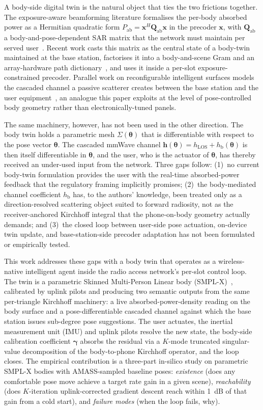\documentclass[journal,twocolumn,10pt]{IEEEtran}
\theoremstyle{plain}
\theoremstyle{definition}
\theoremstyle{remark}
\newcommand{\xx}{\mathbf{x}}
\newcommand{\hh}{\mathbf{h}}
\newcommand{\Pabs}{P_{\mathrm{ab}}}
\newcommand{\Qabs}{\mathbf{Q}_{\mathrm{ab}}}
\newcommand{\thetab}{\bm{\theta}}
\newcommand{\gammab}{\bm{\gamma}}
\newcommand{\hLOS}{h_{\mathrm{LOS}}}
\newcommand{\hbody}{h_{\mathrm{b}}}
\begin{document}
A body-side digital twin is the natural object that ties the two
frictions together. The exposure-aware beamforming literature
formalises the per-body absorbed power as a Hermitian quadratic form
$\Pabs = \xx^H \Qabs \xx$ in the precoder $\xx$, with $\Qabs$ a
body-and-pose-dependent SAR matrix that the network must maintain
per served user~\cite{Hochwald2014, Ying2015, Ying2017}. Recent
work casts this matrix as the central state of a body-twin
maintained at the base station, factorises it into a body-and-scene
Gram and an array-hardware path
dictionary~\cite{Wydaeghe2026jsacv5}, and uses it inside a per-slot
exposure-constrained precoder. Parallel work on reconfigurable
intelligent surfaces models the cascaded channel a passive
scatterer creates between the base station and the user
equipment~\cite{DiRenzo2020,Wu2019}, an analogue this paper
exploits at the level of pose-controlled body geometry rather than
electronically-tuned panels.

The same machinery, however, has not been used in the other
direction. The body twin holds a parametric mesh
$\Sigma(\thetab)$ that is differentiable with respect to the pose
vector $\thetab$. The cascaded mmWave channel
$\hh(\thetab) = \hLOS + \hbody(\thetab)$ is then itself
differentiable in $\thetab$, and the user, who is the actuator of
$\thetab$, has thereby received an under-used input from the
network. Three gaps follow:
(1)~no current body-twin formulation provides the user with the
real-time absorbed-power feedback that the regulatory framing
implicitly promises;
(2)~the body-mediated channel coefficient $\hbody$ has, to the
authors' knowledge, been treated only as a direction-resolved
scattering object suited to forward radiosity, not as the receiver-anchored
Kirchhoff integral that the phone-on-body geometry actually
demands; and
(3)~the closed loop between user-side pose actuation, on-device
twin update, and base-station-side precoder adaptation has not been
formulated or empirically tested.

This work addresses these gaps with a body twin that operates as a
wireless-native intelligent agent inside the radio access network's
per-slot control loop. The twin is a parametric Skinned Multi-Person
Linear body (SMPL-X)~\cite{SMPLX2019}, calibrated by uplink pilots
and producing two semantic outputs from the same per-triangle
Kirchhoff machinery: a live absorbed-power-density reading on the
body surface and a pose-differentiable cascaded channel against
which the base station issues sub-degree pose suggestions. The user
actuates, the inertial measurement unit (IMU) and uplink pilots
resolve the new state, the body-side calibration coefficient
$\gammab$ absorbs the residual via a $K$-mode truncated singular-value
decomposition of the body-to-phone Kirchhoff operator, and the
loop closes. The empirical contribution is a three-part in-silico
study on parametric SMPL-X bodies with AMASS-sampled baseline
poses: \emph{existence} (does any comfortable pose move achieve a
target rate gain in a given scene), \emph{reachability} (does
$K$-iteration uplink-corrected gradient descent reach within 1~dB
of that gain from a cold start), and \emph{failure modes}
(when the loop fails, why).
\end{document}
